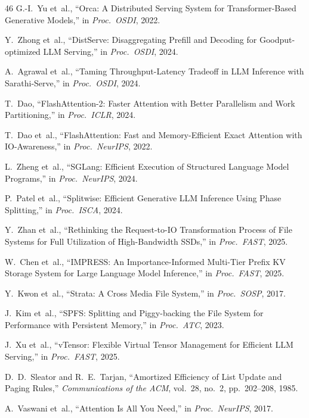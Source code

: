 \documentclass[conference]{IEEEtran}
\begin{document}
\begin{thebibliography}{46}
 G.-I.~Yu et~al., ``Orca: A Distributed Serving System for Transformer-Based Generative Models,'' in \textit{Proc.\ OSDI}, 2022.

 Y.~Zhong et~al., ``DistServe: Disaggregating Prefill and Decoding for Goodput-optimized LLM Serving,'' in \textit{Proc.\ OSDI}, 2024.

 A.~Agrawal et~al., ``Taming Throughput-Latency Tradeoff in LLM Inference with Sarathi-Serve,'' in \textit{Proc.\ OSDI}, 2024.

 T.~Dao, ``FlashAttention-2: Faster Attention with Better Parallelism and Work Partitioning,'' in \textit{Proc.\ ICLR}, 2024.

 T.~Dao et~al., ``FlashAttention: Fast and Memory-Efficient Exact Attention with IO-Awareness,'' in \textit{Proc.\ NeurIPS}, 2022.

 L.~Zheng et~al., ``SGLang: Efficient Execution of Structured Language Model Programs,'' in \textit{Proc.\ NeurIPS}, 2024.

 P.~Patel et~al., ``Splitwise: Efficient Generative LLM Inference Using Phase Splitting,'' in \textit{Proc.\ ISCA}, 2024.

 Y.~Zhan et~al., ``Rethinking the Request-to-IO Transformation Process of File Systems for Full Utilization of High-Bandwidth SSDs,'' in \textit{Proc.\ FAST}, 2025.

 W.~Chen et~al., ``IMPRESS: An Importance-Informed Multi-Tier Prefix KV Storage System for Large Language Model Inference,'' in \textit{Proc.\ FAST}, 2025.

 Y.~Kwon et~al., ``Strata: A Cross Media File System,'' in \textit{Proc.\ SOSP}, 2017.

 J.~Kim et~al., ``SPFS: Splitting and Piggy-backing the File System for Performance with Persistent Memory,'' in \textit{Proc.\ ATC}, 2023.

 J.~Xu et~al., ``vTensor: Flexible Virtual Tensor Management for Efficient LLM Serving,'' in \textit{Proc.\ FAST}, 2025.

 D.~D.~Sleator and R.~E.~Tarjan, ``Amortized Efficiency of List Update and Paging Rules,'' \textit{Communications of the ACM}, vol.~28, no.~2, pp.~202--208, 1985.

 A.~Vaswani et~al., ``Attention Is All You Need,'' in \textit{Proc.\ NeurIPS}, 2017.


\end{thebibliography}
\end{document}
